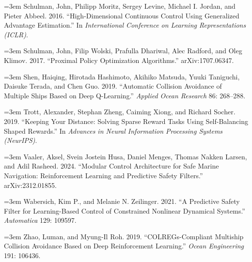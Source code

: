 \documentclass[12pt,letterpaper]{article}
\newcommand{\refitem}[1]{\par\begingroup\emergencystretch=3em\sloppy\noindent\hangindent=0.5in\hangafter=1 #1\par\endgroup}
\begin{document}
\refitem{\hypertarget{ref:schulman2016}{}Schulman, John, Philipp Moritz, Sergey Levine, Michael I. Jordan, and Pieter Abbeel. 2016. ``High-Dimensional Continuous Control Using Generalized Advantage Estimation.'' In \textit{International Conference on Learning Representations (ICLR)}.}

\refitem{\hypertarget{ref:schulman2017}{}Schulman, John, Filip Wolski, Prafulla Dhariwal, Alec Radford, and Oleg Klimov. 2017. ``Proximal Policy Optimization Algorithms.'' arXiv:1707.06347.}

\refitem{\hypertarget{ref:shen2019}{}Shen, Haiqing, Hirotada Hashimoto, Akihiko Matsuda, Yuuki Taniguchi, Daisuke Terada, and Chen Guo. 2019. ``Automatic Collision Avoidance of Multiple Ships Based on Deep Q-Learning.'' \textit{Applied Ocean Research} 86: 268--288.}

\refitem{\hypertarget{ref:trott2019}{}Trott, Alexander, Stephan Zheng, Caiming Xiong, and Richard Socher. 2019. ``Keeping Your Distance: Solving Sparse Reward Tasks Using Self-Balancing Shaped Rewards.'' In \textit{Advances in Neural Information Processing Systems (NeurIPS)}.}

\refitem{\hypertarget{ref:vaaler2024}{}Vaaler, Aksel, Svein Jostein Husa, Daniel Menges, Thomas Nakken Larsen, and Adil Rasheed. 2024. ``Modular Control Architecture for Safe Marine Navigation: Reinforcement Learning and Predictive Safety Filters.'' arXiv:2312.01855.}

\refitem{\hypertarget{ref:wabersich2021}{}Wabersich, Kim P., and Melanie N. Zeilinger. 2021. ``A Predictive Safety Filter for Learning-Based Control of Constrained Nonlinear Dynamical Systems.'' \textit{Automatica} 129: 109597.}

\refitem{\hypertarget{ref:zhao2019}{}Zhao, Luman, and Myung-Il Roh. 2019. ``COLREGs-Compliant Multiship Collision Avoidance Based on Deep Reinforcement Learning.'' \textit{Ocean Engineering} 191: 106436.}
\end{document}
